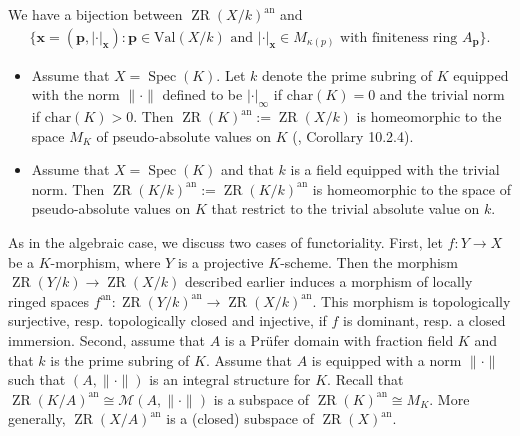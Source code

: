\documentclass [11pt,reqno]{amsart}
\newcommand{\1}{\mathmybb{1}}
\def\cM{{\mathcal{M}}}
\def\an{\operatorname{an}}
\def\Spec{\operatorname{Spec}}
\def\ZR{\operatorname{ZR}}
\begin{document}
\begin{proposition}
\label{prop:ZR_analytic_description_Berkovich-like}
We have a bijection between $\ZR(X/k)^{\an}$ and 
\begin{align*}
\{\mathbf{x}=(\mathbf{p},|\cdot|_{\mathbf{x}}): \mathbf{p}\in\mathrm{Val}(X/k) \text{ and } |\cdot|_{\mathbf{x}}\in M_{\kappa(p)} \text{ with finiteness ring }A_{\mathbf{p}}\}.
\end{align*}
\end{proposition}



\begin{example}
\label{example:ZR_space_analytic}
\begin{itemize}
	\item[(1)] Assume that $X=\Spec(K)$. Let $k$ denote the prime subring of $K$ equipped with the norm $\|\cdot\|$ defined to be $|\cdot|_{\infty}$ if $\mathrm{char}(K)=0$ and the trivial norm if $\mathrm{char}(K)>0$. Then $\ZR(K)^{\an}:=\ZR(X/k)$ is homeomorphic to the space $M_{K}$ of pseudo-absolute values on $K$ (\cite{Sedillot_pav}, Corollary 10.2.4). 
	\item[(2)] Assume that $X=\Spec(K)$ and that $k$ is a field equipped with the trivial norm. Then $\ZR(K/k)^{\an}:=\ZR(K/k)^{\an}$ is homeomorphic to the space of pseudo-absolute values on $K$ that restrict to the trivial absolute value on $k$.
\end{itemize}
\end{example}

As in the algebraic case, we discuss two cases of functoriality. First, let $f:Y\to X$ be a $K$-morphism, where $Y$ is a projective $K$-scheme. Then the morphism $\ZR(Y/k) \to \ZR(X/k)$ described earlier induces a morphism of locally ringed spaces $f^{\an}:\ZR(Y/k)^{\an}\to\ZR(X/k)^{\an}$. This morphism is topologically surjective, resp. topologically closed and injective, if $f$ is dominant, resp. a closed immersion. Second, assume that $A$ is a Prüfer domain with fraction field $K$ and that $k$ is the prime subring of $K$. Assume that $A$ is equipped with a norm $\|\cdot\|$ such that $(A,\|\cdot\|)$ is an integral structure for $K$. Recall that $\ZR(K/A)^{\an}\cong\cM(A,\|\cdot\|)$ is a subspace of $\ZR(K)^{\an}\cong M_{K}$. More generally, $\ZR(X/A)^{\an}$ is a (closed) subspace of $\ZR(X)^{\an}$.
\end{document}
